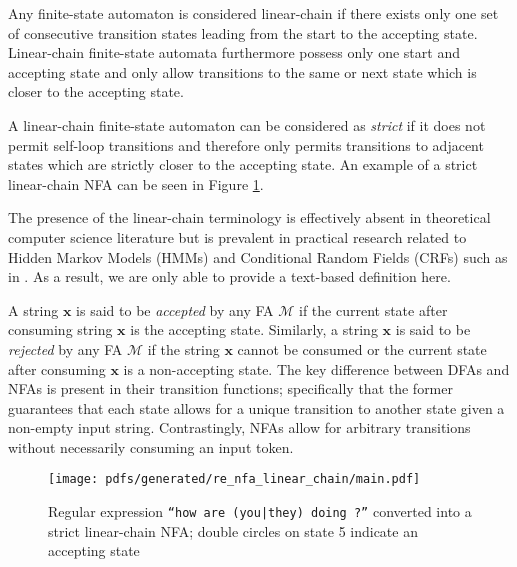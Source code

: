 \begin{definition}
  \label{def:lfa}
  Any finite-state automaton is considered linear-chain if there exists only one
  set of consecutive transition states leading from the start to the accepting
  state. Linear-chain finite-state automata furthermore possess only one start
  and accepting state and only allow transitions to the same or next state which is
  closer to the accepting state.

  \begin{remark}
    \label{rmk:strict_linear_chain}
    A linear-chain finite-state automaton can be considered as \textit{strict}
    if it does not permit self-loop transitions and therefore only permits
    transitions to adjacent states which are strictly closer to the
    accepting state. An example of a strict linear-chain NFA can be seen in
    Figure \ref{fig:regex_fa}.
  \end{remark}

  \begin{remark}
    The presence of the linear-chain terminology is effectively absent in
    theoretical computer science literature but is prevalent in practical
    research related to Hidden Markov Models (HMMs) and Conditional Random
    Fields (CRFs) such as in \citet{tsuruoka2009fast}. As a result, we are only
    able to provide a text-based definition here.
  \end{remark}
  
\end{definition}

A string $\bm{x}$ is said to be \textit{accepted} by any FA $\mathcal{M}$ if the
current state after consuming string $\bm{x}$ is the accepting state. Similarly,
a string $\bm{x}$ is said to be \textit{rejected} by any FA $\mathcal{M}$ if the
string $\bm{x}$ cannot be consumed or the current state after consuming $\bm{x}$
is a non-accepting state. The key difference between DFAs and NFAs is present in
their transition functions; specifically that the former guarantees that each
state allows for a unique transition to another state given a non-empty input
string. Contrastingly, NFAs allow for arbitrary transitions without necessarily
consuming an input token.

\begin{figure}[t]
  \centering
  \texttt{[image: pdfs/generated/re\_nfa\_linear\_chain/main.pdf]}
  \caption{Regular expression \texttt{``how are (you|they) doing ?''} converted
    into a strict linear-chain NFA; double circles on state 5 indicate an
    accepting state}
  \label{fig:regex_fa}
\end{figure}

